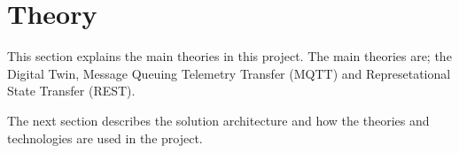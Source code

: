 \section{Theory} \label{sec:theory}
This section explains the main theories in this project. The main theories are; the Digital Twin, Message Queuing Telemetry Transfer (MQTT) and Represetational State Transfer (REST).  






The next section describes the solution architecture and how the theories and technologies are used in the project. 
